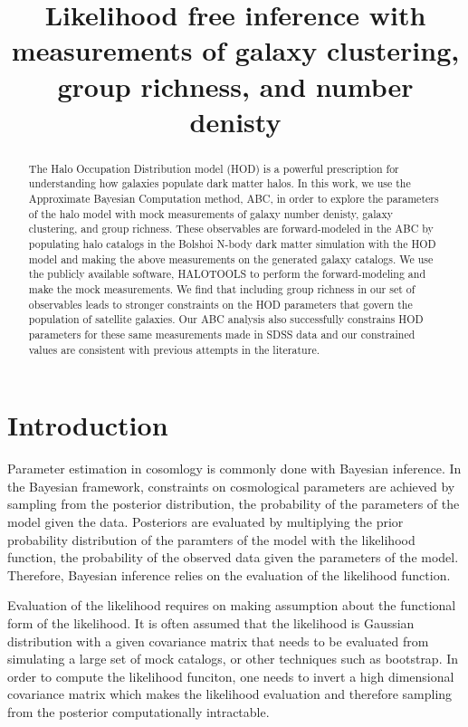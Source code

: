 \documentclass[12pt, preprint]{aastex}
\begin{document}
\title{Likelihood free inference with measurements of galaxy clustering, group richness, and number denisty }

\begin{abstract}

The Halo Occupation Distribution model (HOD) is a powerful prescription for 
understanding how galaxies populate dark matter halos.
In this work, we use the Approximate Bayesian Computation method, 
ABC, in order to explore the parameters of the halo model with mock
measurements of galaxy number denisty, galaxy clustering, 
and group richness. These observables are forward-modeled in the ABC
by populating halo catalogs in the Bolshoi N-body dark matter simulation 
with the HOD model and making the above measurements on the generated
galaxy catalogs. We use the publicly available software, 
HALOTOOLS to perform the forward-modeling and make the mock measurements.
We find that including group richness in our set of observables leads to stronger
constraints on the HOD parameters that govern the population of satellite galaxies.
Our ABC analysis also successfully constrains HOD parameters for these same
measurements made in SDSS data and our constrained values are consistent with
previous attempts in the literature.


\end{abstract}

\section{Introduction}

Parameter estimation in cosomlogy is commonly done with Bayesian inference. 
In the Bayesian framework, constraints on cosmological parameters are achieved by 
sampling from the posterior distribution, the probability of the parameters of the 
model given the data. Posteriors are evaluated by multiplying the prior probability 
distribution of the paramters of the model with the likelihood function, the probability 
of the observed data given the parameters of the model.
Therefore, Bayesian inference relies on the evaluation of the likelihood function.
 
Evaluation of the likelihood requires on making assumption about the functional 
form of the likelihood. It is often assumed that the likelihood is Gaussian distribution 
with a given covariance matrix that needs to be evaluated from simulating a large set of 
mock catalogs, or other techniques such as bootstrap. In order to 
compute the likelihood funciton, one needs to invert a high dimensional covariance 
matrix which makes the likelihood evaluation and therefore sampling from the posterior 
computationally intractable.
\end{document}
